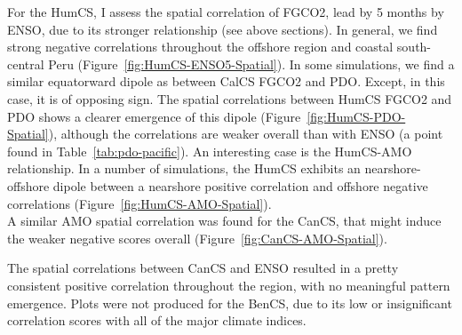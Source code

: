 \documentclass[12pt]{article}
\begin{document}
For the HumCS, I assess the spatial correlation of FGCO2, lead by 5 months by ENSO, due to its stronger relationship (see above sections). In general, we find strong negative correlations throughout the offshore region and coastal south-central Peru (Figure~\ref{fig:HumCS-ENSO5-Spatial}). In some simulations, we find a similar equatorward dipole as between CalCS FGCO2 and PDO. Except, in this case, it is of opposing sign. The spatial correlations between HumCS FGCO2 and PDO shows a clearer emergence of this dipole (Figure~\ref{fig:HumCS-PDO-Spatial}), although the correlations are weaker overall than with ENSO (a point found in Table~\ref{tab:pdo-pacific}). An interesting case is the HumCS-AMO relationship. In a number of simulations, the HumCS exhibits an nearshore-offshore dipole between a nearshore positive correlation and offshore negative correlations (Figure~\ref{fig:HumCS-AMO-Spatial}). \\

A similar AMO spatial correlation was found for the CanCS, that might induce the weaker negative scores overall (Figure~\ref{fig:CanCS-AMO-Spatial}).

The spatial correlations between CanCS and ENSO resulted in a pretty consistent positive correlation throughout the region, with no meaningful pattern emergence. Plots were not produced for the BenCS, due to its low or insignificant correlation scores with all of the major climate indices.
\end{document}
